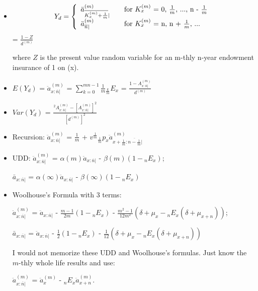 \documentclass[]{book}
\begin{document}
\begin{itemize}
\item
  \[Y_d = \left\{
    \begin{array}{l l}
      \ddot{a}^{(m)}_{\overline{K^{(m)}_x + \frac{1}{m}}| }   & \quad \text{for $K^{(m)}_x$ = 0, $\frac{1}{m}$, ..., n - $\frac{1}{m}$}\\
      \ddot{a}^{(m)}_{\overline{n}|}             & \quad \text{for $K^{(m)}_x$ = n, n + $\frac{1}{m}$, ...}\\
    \end{array} \right.\] = \(\frac{1 - Z}{d^{(m)}}\)

  where \(Z\) is the present value random variable for an m-thly n-year
  endowment insurance of 1 on (x).
\item
  \(E(Y_d)\) = \(\ddot{a}^{(m)}_{x :\overline{n}|}\) =
  \(\sum^{mn - 1}_{k = 0} \frac{1}{m} {}_{\frac{k}{m}}E_x\) =
  \(\frac{1 - A^{(m)}_{x :\overline{n}|}}{d^{(m)}}\)
\item
  \(Var(Y_d)\) =
  \(\frac{^2A^{(m)}_{x :\overline{n}|} - [A^{(m)}_{x :\overline{n}|}]^2}{[d^{(m)}]^2}\)
\item
  Recursion: \(\ddot{a}^{(m)}_{x :\overline{n}|}\) = \(\frac{1}{m}\) +
  \(v^{\frac{1}{m}}{}_{\frac{1}{m}}p_x\ddot{a}^{(m)}_{x + \frac{1}{m} :\overline{n - \frac{1}{m}}| }\)
\item
  UDD: \(\ddot{a}^{(m)}_{x :\overline{n}|}\) =
  \(\alpha(m)\)\(\ddot{a}_{x:\overline{n}|}\) -
  \(\beta(m)\)\((1 - {}_{n}E_x)\);

  \(\bar{a}_{x:\overline{n}|}\) =
  \(\alpha(\infty)\)\(\ddot{a}_{x:\overline{n}|}\) -
  \(\beta(\infty)\)\((1 - {}_{n}E_x)\)
\item
  Woolhouse's Formula with 3 terms:

  \(\ddot{a}^{(m)}_{x :\overline{n}|}\) = \(\ddot{a}_{x:\overline{n}|}\)
  - \(\frac{m - 1}{2m}\)\((1 - {}_{n}E_x)\) -
  \(\frac{m^2 - 1}{12m^2}\)\((\delta + \mu_x - {}_{n}E_x(\delta + \mu_{x + n}))\);

  \(\bar{a}_{x:\overline{n}|}\) = \(\ddot{a}_{x:\overline{n}|}\) -
  \(\frac{1}{2}\)\((1 - {}_{n}E_x)\) -
  \(\frac{1}{12}\)\((\delta + \mu_x - {}_{n}E_x(\delta + \mu_{x + n}))\)

  I would not memorize these UDD and Woolhouse's formulas. Just know the
  \(m\)-thly whole life results and use:

  \(\ddot{a}^{(m)}_{x :\overline{n}|}\) = \(\ddot{a}^{(m)}_{x}\) -
  \({}_{n}E_x\)\(\ddot{a}^{(m)}_{x + n}\).
\end{itemize}
\end{document}
